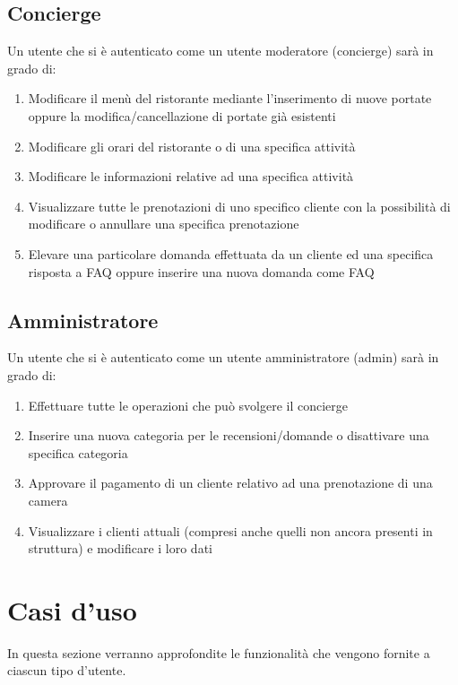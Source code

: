\documentclass [a4paper, 12pt]{book}
\begin{document}
\subsection{Concierge}
Un utente che si è autenticato come un utente moderatore (concierge) sarà in grado di:
\begin{enumerate}
\item Modificare il menù del ristorante mediante l'inserimento di nuove portate oppure la modifica/cancellazione di portate già esistenti
\item Modificare gli orari del ristorante o di una specifica attività
\item Modificare le informazioni relative ad una specifica attività
\item Visualizzare tutte le prenotazioni di uno specifico cliente con la possibilità di modificare o annullare una specifica prenotazione
\item Elevare una particolare domanda effettuata da un cliente ed una specifica risposta a FAQ oppure inserire una nuova domanda come FAQ
\end{enumerate}
\subsection{Amministratore}
Un utente che si è autenticato come un utente amministratore (admin) sarà in grado di:
\begin{enumerate}
\item Effettuare tutte le operazioni che può svolgere il concierge
\item Inserire una nuova categoria per le recensioni/domande o disattivare una specifica categoria
\item Approvare il pagamento di un cliente relativo ad una prenotazione di una camera
\item Visualizzare i clienti attuali (compresi anche quelli non ancora presenti in struttura) e modificare i loro dati
\end{enumerate}

\medskip
\medskip

\section{Casi d'uso}
In questa sezione verranno approfondite le funzionalità che vengono fornite a ciascun tipo d'utente.
\end{document}
